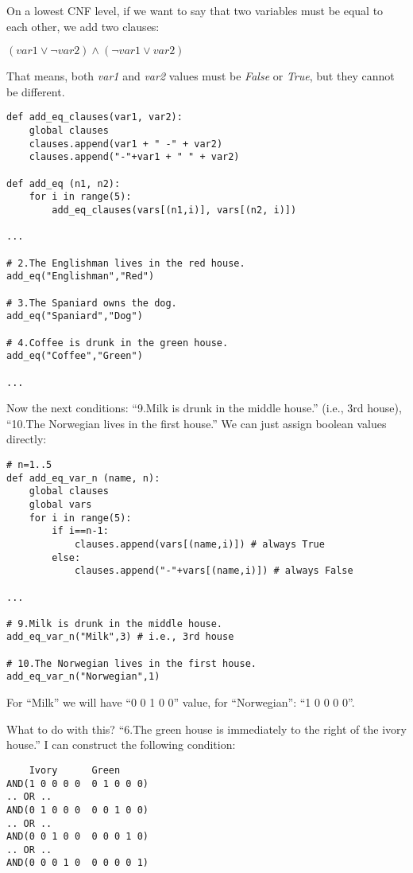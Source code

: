 On a lowest CNF level, if we want to say that two variables must be equal to each other, we add two clauses:

$(var1 \vee \neg var2) \wedge (\neg var1 \vee var2)$

That means, both \textit{var1} and \textit{var2} values must be \textit{False} or \textit{True},
but they cannot be different.

\begin{lstlisting}
def add_eq_clauses(var1, var2):
    global clauses
    clauses.append(var1 + " -" + var2)
    clauses.append("-"+var1 + " " + var2)

def add_eq (n1, n2):
    for i in range(5):
        add_eq_clauses(vars[(n1,i)], vars[(n2, i)])

...

# 2.The Englishman lives in the red house.
add_eq("Englishman","Red")

# 3.The Spaniard owns the dog.
add_eq("Spaniard","Dog")

# 4.Coffee is drunk in the green house.
add_eq("Coffee","Green")

...

\end{lstlisting}

Now the next conditions:
``9.Milk is drunk in the middle house.'' (i.e., 3rd house), ``10.The Norwegian lives in the first house.''
We can just assign boolean values directly:

\begin{lstlisting}
# n=1..5
def add_eq_var_n (name, n):
    global clauses
    global vars
    for i in range(5):
        if i==n-1:
            clauses.append(vars[(name,i)]) # always True
        else:
            clauses.append("-"+vars[(name,i)]) # always False

...

# 9.Milk is drunk in the middle house.
add_eq_var_n("Milk",3) # i.e., 3rd house

# 10.The Norwegian lives in the first house.
add_eq_var_n("Norwegian",1)
\end{lstlisting}

For ``Milk'' we will have ``0 0 1 0 0'' value, for ``Norwegian'': ``1 0 0 0 0''.

What to do with this?
``6.The green house is immediately to the right of the ivory house.''
I can construct the following condition:

\begin{lstlisting}
    Ivory      Green
AND(1 0 0 0 0  0 1 0 0 0)
.. OR ..
AND(0 1 0 0 0  0 0 1 0 0)
.. OR ..
AND(0 0 1 0 0  0 0 0 1 0)
.. OR ..
AND(0 0 0 1 0  0 0 0 0 1)
\end{lstlisting}

